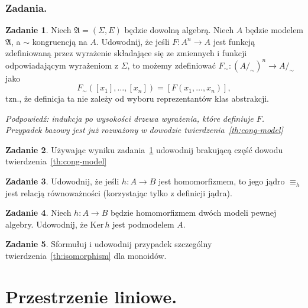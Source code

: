 \documentclass{book}
\theoremstyle{definition}
\newtheorem{exercise}{Zadanie}[section]
\begin{document}
\subsection{Zadania.}

\begin{exercise}\label{ex:first-cong}
	Niech $\mathfrak{A} = (\Sigma, E)$ będzie dowolną algebrą.
	Niech $A$ będzie modelem $\mathfrak{A}$,
		a $\sim$ kongruencją na $A$.
	Udowodnij,
		że jeśli $F: A^n \to A$ jest funkcją zdefiniowaną przez wyrażenie składające się
		ze zmiennych i funkcji odpowiadającym wyrażeniom z $\Sigma$,
		to możemy zdefiniować $F_\sim : (A/_\sim)^n \to A/_\sim$ jako
	\begin{equation}
		F_\sim([x_1], \dots, [x_n]) = [F(x_1, \dots, x_n)],
	\end{equation}
		tzn., że definicja ta nie zależy od wyboru reprezentantów klas abstrakcji.

	\textit{Podpowiedź: indukcja po wysokości drzewa wyrażenia, które definiuje $F$.
	Przypadek bazowy jest już rozważony w dowodzie twierdzenia~\ref{th:cong-model}}
\end{exercise}

\begin{exercise}\label{ex:last-cong}
	Używając wyniku zadania~\ref{ex:first-cong} udowodnij brakującą część dowodu twierdzenia~\ref{th:cong-model}
\end{exercise}

\begin{exercise}\label{ex:ker-equiv}
	Udowodnij,
		że jeśli $h: A \to B$ jest homomorfizmem,
		to jego jądro $\equiv_h$ jest relacją równoważności
		(korzystając tylko z definicji jądra).
\end{exercise}

\begin{exercise}\label{ex:ker-submodel}
	Niech $h: A \to B$ będzie homomorfizmem dwóch modeli pewnej algebry.
	Udowodnij, że $\mathrm{Ker}\,h$ jest podmodelem $A$.
\end{exercise}

\begin{exercise}
	Sformułuj i udowodnij przypadek szczególny twierdzenia~\ref{th:isomorphism} dla monoidów.
\end{exercise}


\chapter{Przestrzenie liniowe.}
\end{document}
